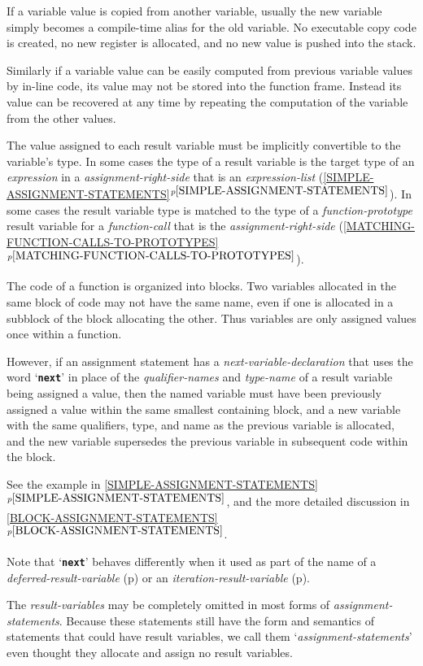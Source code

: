 \documentclass[12pt]{article}
\makeatletter
\newcommand{\TT}[1]{{\tt \bfseries #1}}
\newcommand{\ttkey}[1]{\TT{#1}\index{#1@{\tt #1}}}
\newcommand{\itemref}[1]{\ref{#1}$^{p\pageref{#1}}$}
\newcommand{\pagref}[1]{p\pageref{#1}}
\makeatother
\begin{document}
If a variable value is copied from another variable, usually the
new variable simply becomes a compile-time alias for the old variable.
No executable copy code is created, no new register is allocated, and no new
value is pushed into the stack.

Similarly if a variable value can be easily computed from previous variable
values by in-line code, 
its value may not be stored into the function frame.  Instead its
value can be recovered at any time by repeating the computation
of the variable from the other values.

The value assigned to each result variable must be implicitly convertible to
the variable's type.  In some cases the type of a result variable is
the target type of an {\em expression} in a {\em assignment-right-side}
that is an {\em expression-list}
(\itemref{SIMPLE-ASSIGNMENT-STATEMENTS}).
In some cases the result variable type is matched to
the type of a {\em function-prototype} result variable
for a {\em function-call} that is the {\em assignment-right-side}
(\itemref{MATCHING-FUNCTION-CALLS-TO-PROTOTYPES}).

The code of a function is organized into blocks.
Two variables allocated in the same block of code may not have the same
name, even if one is allocated in a subblock of the block allocating
the other.
Thus variables are only assigned values once within a function.

However, if an assignment statement has a {\em next-variable-declaration}
that uses the word `\ttkey{next}'\label{NEXT} in
place of the {\em qualifier-names} and {\em type-name}
of a result variable being assigned a value, then the named variable must
have been previously assigned a value within the same smallest containing block,
and a new variable with the same qualifiers, type, and name
as the previous variable is allocated,
and the new variable supersedes the previous variable
in subsequent code within the block.

See the example in \itemref{SIMPLE-ASSIGNMENT-STATEMENTS}, and
the more detailed discussion in 
\itemref{BLOCK-ASSIGNMENT-STATEMENTS}.

Note that `\TT{next}' behaves differently when it used as part of
the name of
a {\em deferred-result-variable} (\pagref{DEFERRED-RESULT-VARIABLE})
or an {\em iteration-result-variable} (\pagref{ITERATION-RESULT-VARIABLE}).

The {\em result-variables} may be completely omitted in most forms
of {\em assignment-statements}.  Because these statements still have
the form and semantics of statements that could have result variables,
we call them `{\em assignment-statements}' even thought they allocate
and assign no result variables.
\end{document}
